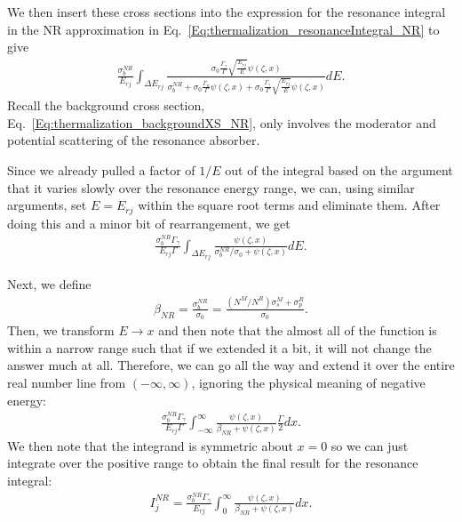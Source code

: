We then insert these cross sections into the expression for the resonance integral in the NR approximation in Eq.~\eqref{Eq:thermalization_resonanceIntegral_NR} to give
\begin{align}
  \frac{ \sigma_b^{NR} }{ E_{rj} } \int_{\Delta E_{rj}}  \frac{ \sigma_0 \frac{\Gamma_\gamma}{\Gamma} \sqrt{ \frac{E_{rj}}{E} } \psi(\zeta,x) }{ \sigma_b^{NR} +  \sigma_0 \frac{\Gamma_n}{\Gamma} \psi(\zeta,x) + \sigma_0 \frac{\Gamma_\gamma}{\Gamma} \sqrt{ \frac{E_{rj}}{E} } \psi(\zeta,x) } dE  . \nonumber
\end{align}
Recall the background cross section, Eq.~\eqref{Eq:thermalization_backgroundXS_NR}, only involves the moderator and potential scattering of the resonance absorber.

Since we already pulled a factor of $1/E$ out of the integral based on the argument that it varies slowly over the resonance energy range, we can, using similar arguments, set $E = E_{rj}$ within the square root terms and eliminate them. After doing this and a minor bit of rearrangement, we get
\begin{align}
  \frac{ \sigma_b^{NR} \Gamma_\gamma }{ E_{rj} \Gamma } \int_{\Delta E_{rj}}  \frac{ \psi(\zeta,x) }{ \sigma_b^{NR} / \sigma_0  +  \psi(\zeta,x) } dE  . \nonumber
\end{align}

Next, we define
\begin{align}
  \beta_{NR} = \frac{ \sigma_b^{NR} }{\sigma_0} = \frac{ (N^M/N^R) \sigma_s^M + \sigma_p^R }{ \sigma_0 } .
\end{align}
Then, we transform $E \rightarrow x$ and then note that the almost all of the function is within a narrow range such that if we extended it a bit, it will not change the answer much at all. Therefore, we can go all the way and extend it over the entire real number line from $(-\infty,\infty)$, ignoring the physical meaning of negative energy:
\begin{align}
  \frac{ \sigma_b^{NR} \Gamma_\gamma }{ E_{rj} \Gamma } \int_{-\infty}^\infty  \frac{ \psi(\zeta,x) }{ \beta_{NR} + \psi(\zeta,x) } \frac{\Gamma}{2} dx . \nonumber
\end{align}
We then note that the integrand is symmetric about $x = 0$ so we can just integrate over the positive range to obtain the final result for the resonance integral:
\begin{align}
  I_j^{NR} = \frac{ \sigma_b^{NR} \Gamma_\gamma }{ E_{rj} } \int_0^\infty  \frac{ \psi(\zeta,x) }{ \beta_{NR} + \psi(\zeta,x) }  dx .  \label{Eq:thermalization_resonanceIntegral_NR_slbw_betaPsiForm}
\end{align}

